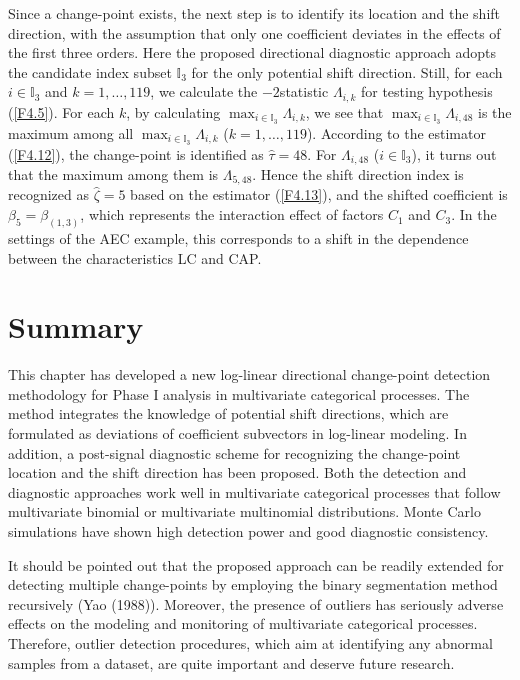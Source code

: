 Since a change-point exists, the next step is to identify its location and the shift
direction, with the assumption that only one coefficient deviates in the effects of
the first three orders. Here the proposed directional diagnostic approach adopts the
candidate index subset $\mathbb{I}_3$ for the only potential shift direction. Still,
for each $i\in\mathbb{I}_3$ and $k=1,\ldots,119$, we calculate the $-2$statistic
$\Lambda_{i,k}$ for testing hypothesis (\ref{F4.5}). For each $k$, by calculating
$\max_{i\in\mathbb{I}_3}\Lambda_{i,k}$, we see that
$\max_{i\in\mathbb{I}_3}\Lambda_{i,48}$ is the maximum among all
$\max_{i\in\mathbb{I}_3}\Lambda_{i,k}$ ($k=1,\ldots,119$). According to the
estimator (\ref{F4.12}), the change-point is identified as $\hat{\tau}=48$. For
$\Lambda_{i,48}$ ($i\in\mathbb{I}_3$), it turns out that the maximum among them is
$\Lambda_{5,48}$. Hence the shift direction index is recognized as $\hat{\zeta}=5$
based on the estimator (\ref{F4.13}), and the shifted coefficient is
$\beta_5=\beta_{(1,3)}$, which represents the interaction effect of factors $C_1$
and $C_3$. In the settings of the AEC example, this corresponds to a shift in the
dependence between the characteristics LC and CAP.


\section{Summary}\label{sec4.6}

This chapter has developed a new log-linear directional change-point detection
methodology for Phase I analysis in multivariate categorical processes. The method
integrates the knowledge of potential shift directions, which are formulated as
deviations of coefficient subvectors in log-linear modeling. In addition, a
post-signal diagnostic scheme for recognizing the change-point location and the
shift direction has been proposed. Both the detection and diagnostic approaches work
well in multivariate categorical processes that follow multivariate binomial or
multivariate multinomial distributions. Monte Carlo simulations have shown high
detection power and good diagnostic consistency.

It should be pointed out that the proposed approach can be readily extended for
detecting multiple change-points by employing the binary segmentation method
recursively (Yao (1988)). Moreover, the presence of outliers has seriously adverse
effects on the modeling and monitoring of multivariate categorical processes.
Therefore, outlier detection procedures, which aim at identifying any abnormal
samples from a dataset, are quite important and deserve future research.



